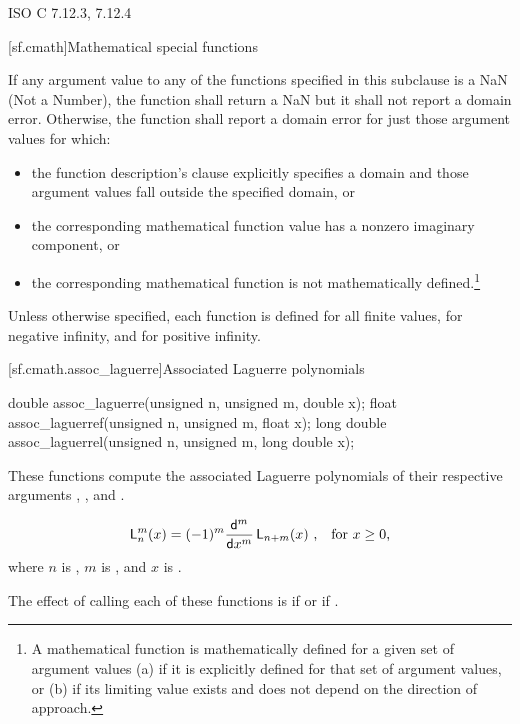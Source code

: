\xref
ISO C 7.12.3, 7.12.4

[sf.cmath]{Mathematical special functions}%
%

\pnum{}%
If any argument value
to any of the functions specified in this subclause
is a NaN (Not a Number),
the function shall return a NaN
but it shall not report a domain error.
Otherwise,
the function shall report a domain error
for just those argument values
for which:

\begin{itemize}
  \item
  the function description's \returns clause
  explicitly specifies a domain
  and those argument values fall
  outside the specified domain,
  or

  \item
  the corresponding mathematical function value
  has a nonzero imaginary component,
  or

  \item
  the corresponding mathematical function
  is not mathematically defined.\footnote{%
    A mathematical function
    is mathematically defined
    for a given set of argument values
    (a)
      if it is explicitly defined
      for that set of argument values,
      or
    (b)
      if its limiting value exists
      and does not depend
      on the direction of approach.}
\end{itemize}

\pnum
Unless otherwise specified,
each function is defined
for all finite values,
for negative infinity,
and for positive infinity.

[sf.cmath.assoc_laguerre]{Associated Laguerre polynomials}%
%
%
%
%
%
\begin{itemdecl}
double       assoc_laguerre(unsigned n, unsigned m, double x);
float        assoc_laguerref(unsigned n, unsigned m, float x);
long double  assoc_laguerrel(unsigned n, unsigned m, long double x);
\end{itemdecl}

\begin{itemdescr}
\pnum
\effects
These functions compute
the associated Laguerre polynomials
of their respective arguments
, , and .

\pnum
\returns
\[ \mathsf{L}_n^m(x) =
   (-1)^m \frac{\mathsf{d} ^ m}{\mathsf{d}x ^ m} \, \mathsf{L}_{n+m}(x)
   \text{ ,\quad for $x \ge 0$,} \]
where
$n$ is ,
$m$ is , and
$x$ is .

\pnum
\remarks
The effect of calling each of these functions
is 
if  or if .
\end{itemdescr}

